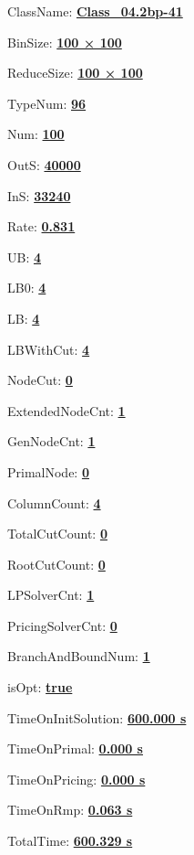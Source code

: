 \documentclass[11pt]{article}
\begin{document}
\pagestyle{empty}


ClassName: \underline{\textbf{Class_04.2bp-41}}
\par
BinSize: \underline{\textbf{100 × 100}}
\par
ReduceSize: \underline{\textbf{100 × 100}}
\par
TypeNum: \underline{\textbf{96}}
\par
Num: \underline{\textbf{100}}
\par
OutS: \underline{\textbf{40000}}
\par
InS: \underline{\textbf{33240}}
\par
Rate: \underline{\textbf{0.831}}
\par
UB: \underline{\textbf{4}}
\par
LB0: \underline{\textbf{4}}
\par
LB: \underline{\textbf{4}}
\par
LBWithCut: \underline{\textbf{4}}
\par
NodeCut: \underline{\textbf{0}}
\par
ExtendedNodeCnt: \underline{\textbf{1}}
\par
GenNodeCnt: \underline{\textbf{1}}
\par
PrimalNode: \underline{\textbf{0}}
\par
ColumnCount: \underline{\textbf{4}}
\par
TotalCutCount: \underline{\textbf{0}}
\par
RootCutCount: \underline{\textbf{0}}
\par
LPSolverCnt: \underline{\textbf{1}}
\par
PricingSolverCnt: \underline{\textbf{0}}
\par
BranchAndBoundNum: \underline{\textbf{1}}
\par
isOpt: \underline{\textbf{true}}
\par
TimeOnInitSolution: \underline{\textbf{600.000 s}}
\par
TimeOnPrimal: \underline{\textbf{0.000 s}}
\par
TimeOnPricing: \underline{\textbf{0.000 s}}
\par
TimeOnRmp: \underline{\textbf{0.063 s}}
\par
TotalTime: \underline{\textbf{600.329 s}}
\par
\newpage
\end{document}
